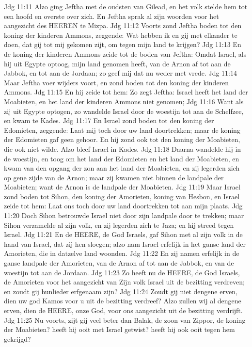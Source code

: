 Jdg 11:11  Alzo ging Jeftha met de oudsten van Gilead, en het volk stelde hem tot een hoofd en overste over zich. En Jeftha sprak al zijn woorden voor het aangezicht des HEEREN te Mizpa.
Jdg 11:12  Voorts zond Jeftha boden tot den koning der kinderen Ammons, zeggende: Wat hebben ik en gij met elkander te doen, dat gij tot mij gekomen zijt, om tegen mijn land te krijgen?
Jdg 11:13  En de koning der kinderen Ammons zeide tot de boden van Jeftha: Omdat Israel, als hij uit Egypte optoog, mijn land genomen heeft, van de Arnon af tot aan de Jabbok, en tot aan de Jordaan; zo geef mij dat nu weder met vrede.
Jdg 11:14  Maar Jeftha voer wijders voort, en zond boden tot den koning der kinderen Ammons.
Jdg 11:15  En hij zeide tot hem: Zo zegt Jeftha: Israel heeft het land der Moabieten, en het land der kinderen Ammons niet genomen;
Jdg 11:16  Want als zij uit Egypte optogen, zo wandelde Israel door de woestijn tot aan de Schelfzee, en kwam te Kades.
Jdg 11:17  En Israel zond boden tot den koning der Edomieten, zeggende: Laat mij toch door uw land doortrekken; maar de koning der Edomieten gaf geen gehoor. En hij zond ook tot den koning der Moabieten, die ook niet wilde. Alzo bleef Israel in Kades.
Jdg 11:18  Daarna wandelde hij in de woestijn, en toog om het land der Edomieten en het land der Moabieten, en kwam van den opgang der zon aan het land der Moabieten, en zij legerden zich op gene zijde van de Arnon; maar zij kwamen niet binnen de landpale der Moabieten; want de Arnon is de landpale der Moabieten.
Jdg 11:19  Maar Israel zond boden tot Sihon, den koning der Amorieten, koning van Hesbon, en Israel zeide tot hem: Laat ons toch door uw land doortrekken tot aan mijn plaats.
Jdg 11:20  Doch Sihon betrouwde Israel niet door zijn landpale door te trekken; maar Sihon verzamelde al zijn volk, en zij legerden zich te Jaza; en hij streed tegen Israel.
Jdg 11:21  En de HEERE, de God Israels, gaf Sihon met al zijn volk in de hand van Israel, dat zij hen sloegen; alzo nam Israel erfelijk in het ganse land der Amorieten, die in datzelve land woonden.
Jdg 11:22  En zij namen erfelijk in de ganse landpale der Amorieten, van de Arnon af tot aan de Jabbok, en van de woestijn tot aan de Jordaan.
Jdg 11:23  Zo heeft nu de HEERE, de God Israels, de Amorieten voor het aangezicht van Zijn volk Israel uit de bezitting verdreven; en zoudt gij hunlieder erfgenaam zijn?
Jdg 11:24  Zoudt gij niet dengene erven, dien uw god Kamos voor u uit de bezitting verdreef? Alzo zullen wij al dengene erven, dien de HEERE, onze God, voor ons aangezicht uit de bezitting verdrijft.
Jdg 11:25  Nu voorts, zijt gij veel beter dan Balak, de zoon van Zippor, de koning der Moabieten? heeft hij ooit met Israel getwist? heeft hij ook ooit tegen hem gekrijgd?
